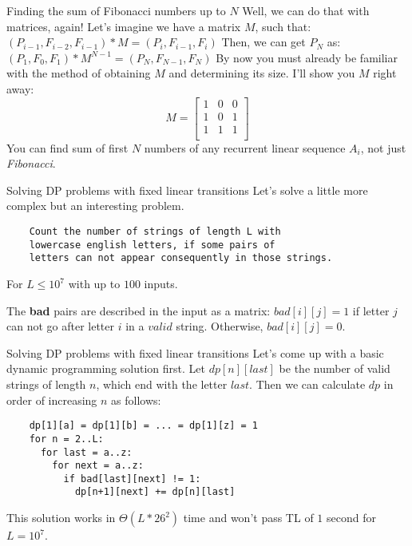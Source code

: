 \documentclass{beamer}
\begin{document}
\begin{frame}{Finding the sum of Fibonacci numbers up to $N$}
  Well, we can do that with matrices, again!
  \newline Let's imagine we have a matrix $M$, such that:
  \newline
  $(P_{i-1}, F_{i-2}, F_{i-1}) * M = (P_i, F_{i-1}, F_i)$
  \pause \newline
  Then, we can get $P_N$ as:
  \newline
  $(P_1, F_0, F_1) * M^{N-1} = (P_N, F_{N-1}, F_N)$
  \pause \newline
  By now you must already be familiar with the method of 
  obtaining $M$ and determining its size. I'll show you $M$ right away:
  \pause
  \[
    M = 
    \left[ {
      \begin{array}{ccc}
        1 & 0 & 0 \\
        1 & 0 & 1 \\
        1 & 1 & 1 \\      
      \end{array} } 
    \right]
  \]
  \pause
  You can find sum of first $N$ numbers of any recurrent linear sequence $A_i$, not just \textit{Fibonacci}.
\end{frame}

\begin{frame}[fragile]{Solving DP problems with fixed linear transitions}
  Let's solve a little more complex but an interesting problem.
  \pause
  \begin{lstlisting}
    Count the number of strings of length L with 
    lowercase english letters, if some pairs of
    letters can not appear consequently in those strings.     
  \end{lstlisting}
  \centerline{For $L \leq 10^7$ with up to $100$ inputs.}

  The \textbf{bad} pairs are described in the input as a matrix: 
  \newline
    $bad[i][j] = 1$ if letter $j$ can not go after letter $i$ in a $valid$ string.
  \newline
    Otherwise, $bad[i][j] = 0$.
\end{frame}

\begin{frame}[fragile]{Solving DP problems with fixed linear transitions}
  Let's come up with a basic dynamic programming solution first.
  \pause \newline
  Let $dp[n][last]$ be the number of valid strings of length $n$, which end with the letter $last$.
  \pause \newline
  Then we can calculate $dp$ in order of increasing $n$ as follows:
  \begin{lstlisting}
    dp[1][a] = dp[1][b] = ... = dp[1][z] = 1
    for n = 2..L:
      for last = a..z:
        for next = a..z:
          if bad[last][next] != 1:
            dp[n+1][next] += dp[n][last]
  \end{lstlisting}
  \pause
  This solution works in $\Theta(L * 26^2)$ time and won't pass TL of $1$ second for $L = 10^7$.
\end{frame}
\end{document}
